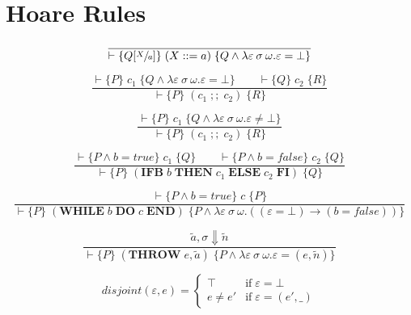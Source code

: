 \section{Hoare Rules}

\begin{equation}\label{eqn:hoare-assign}
\frac{}{\vdash \{Q[\sfrac{X}{a}]\} \; (X ::= a) \; \{Q \wedge \lambda \varepsilon\:\sigma\:\omega. \varepsilon = \bot\}}
\end{equation}

\begin{equation}
\frac{\vdash \{P\} \; c_1 \; \{Q \wedge \lambda \varepsilon\:\sigma\:\omega. \varepsilon = \bot\} \qquad \vdash \{Q\} \; c_2 \; \{R\}}{\vdash \{P\} \; (c_1\; ;;\; c_2) \; \{R\}}
\end{equation}

\begin{equation}
\frac{\vdash \{P\} \; c_1 \; \{Q \wedge \lambda \varepsilon\:\sigma\:\omega. \varepsilon \neq \bot\}}{\vdash \{P\} \; (c_1\; ;;\; c_2) \; \{R\}}
\end{equation}

\begin{equation}
\frac{\vdash \{P \wedge b=true\} \; c_1 \; \{Q\} \qquad \vdash \{P \wedge b=false\} \; c_2 \; \{Q\}}{\vdash \{P\} \; (\textbf{IFB}\; b\; \textbf{THEN}\; c_1\; \textbf{ELSE}\; c_2\; \textbf{FI}) \; \{Q\}}
\end{equation}

\begin{equation}
\frac{\vdash \{P \wedge b = true\} \; c \; \{P\}}{\vdash \{P\} \; (\textbf{WHILE}\; b\; \textbf{DO}\; c\; \textbf{END}) \; \{P \wedge \lambda \varepsilon\:\sigma\:\omega.((\varepsilon = \bot) \rightarrow (b = false))\}}
\end{equation}

\begin{equation}
\frac{\tilde{a}, \sigma \Downarrow \tilde{n}}{\vdash \{P\} \; (\textbf{THROW}\; e, \tilde{a}) \; \{P \wedge \lambda \varepsilon\:\sigma\:\omega. \varepsilon = (e, \tilde{n})\}}
\end{equation}

\begin{equation}
disjoint(\varepsilon, e) = \begin{cases}
\top & \mbox{if} \; \varepsilon = \bot \\
e \neq e' & \mbox{if} \; \varepsilon = (e', \_)
\end{cases}
\end{equation}

